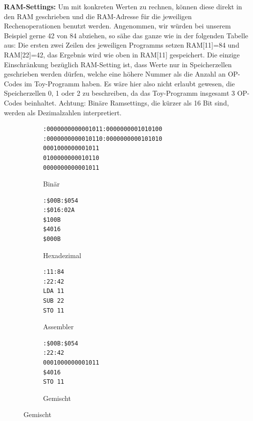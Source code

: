 \documentclass{article}
\begin{document}
\noindent \textbf{RAM-Settings:} Um mit konkreten Werten zu rechnen, können diese direkt in den RAM geschrieben
und die RAM-Adresse für die jeweiligen Rechenoperationen benutzt
werden. Angenommen, wir würden bei unserem Beispiel gerne 42 von 84 abziehen,
so sähe das ganze wie in der folgenden Tabelle aus: Die ersten zwei Zeilen des jeweiligen
Programms setzen RAM[11]=84 und RAM[22]=42, das Ergebnis wird wie oben in
RAM[11] gespeichert. Die einzige Einschränkung bezüglich RAM-Setting ist, dass Werte nur in
Speicherzellen geschrieben werden dürfen, welche eine höhere Nummer als die Anzahl an OP-Codes im
Toy-Programm haben. Es wäre hier also nicht erlaubt gewesen, die Speicherzellen
0, 1 oder 2 zu beschreiben, da das Toy-Programm insgesamt 3 OP-Codes beinhaltet. Achtung: Binäre Ramsettings,
die kürzer als 16 Bit sind, werden als Dezimalzahlen interpretiert.
\begin{figure}[h!]
    \centering
    \begin{subfigure}[b]{0.45\textwidth}
\begin{lstlisting}
:0000000000001011:0000000001010100
:0000000000010110:0000000000101010
0001000000001011
0100000000010110
0000000000001011
\end{lstlisting}
        \caption{Binär}
   \end{subfigure}
   \begin{subfigure}[b]{0.15\textwidth}
\begin{lstlisting}
:$00B:$054
:$016:02A
$100B
$4016
$000B
\end{lstlisting}
        \caption{Hexadezimal}
    \end{subfigure}
    \begin{subfigure}[b]{0.15\textwidth}
\begin{lstlisting}
:11:84
:22:42
LDA 11
SUB 22
STO 11
\end{lstlisting}
        \caption{Assembler}
    \end{subfigure}
    \begin{subfigure}[b]{0.2\textwidth}
\begin{lstlisting}
:$00B:$054
:22:42
0001000000001011
$4016
STO 11
\end{lstlisting}
        \caption{Gemischt}
\end{subfigure}
\end{figure}
\end{document}
